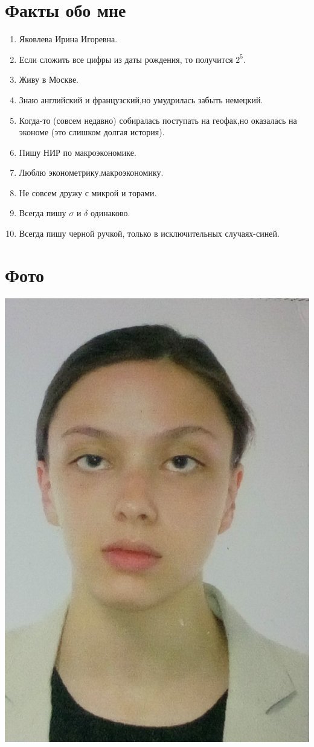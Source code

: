 \documentclass[12pt, a4paper]{article}
\begin{document}
\section{Факты обо мне}
\begin{enumerate}
\item Яковлева Ирина Игоревна.
\item Если сложить все цифры из даты рождения, то получится $2^5$.
\item Живу в Москве.
\item Знаю английский и французский,но умудрилась забыть немецкий.
\item Когда-то (совсем недавно) собиралась поступать на геофак,но оказалась на экономе (это слишком долгая история).
\item Пишу НИР по макроэкономике.
\item Люблю эконометрику,макроэкономику.
\item Не совсем дружу с микрой и торами.
\item Всегда пишу $\sigma$ и $\delta$ одинаково.
\item Всегда пишу черной ручкой, только в исключительных случаях-синей.
\end{enumerate}
\section{Фото}
\includegraphics[scale=0.09]{foto.png}
\end{document}

